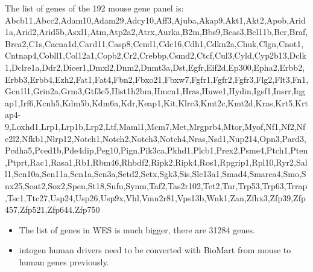 \documentclass[
  letterpaper,
  DIV=11,
  numbers=noendperiod]{scrreprt}
\providecommand{\tightlist}{%
  \setlength{\itemsep}{0pt}\setlength{\parskip}{0pt}}\usepackage{longtable,booktabs,array}
\begin{document}
The list of genes of the 192 mouse gene panel is:
Abcb11,Abcc2,Adam10,Adam29,Adcy10,Aff3,Ajuba,Akap9,Akt1,Akt2,Apob,Arid1a,Arid2,Arid5b,Asxl1,Atm,Atp2a2,Atrx,Aurka,B2m,Bbs9,Bcas3,Bcl11b,Bcr,Braf,Brca2,C1s,Cacna1d,Card11,Casp8,Ccnd1,Cdc16,Cdh1,Cdkn2a,Chuk,Clgn,Cnot1,Cntnap4,Cobll1,Col12a1,Copb2,Cr2,Crebbp,Csmd2,Ctcf,Cul3,Cyld,Cyp2b13,Dclk1,Dclre1a,Ddr2,Dicer1,Dmxl2,Dnm2,Dnmt3a,Dst,Egfr,Eif2d,Ep300,Epha2,Erbb2,Erbb3,Erbb4,Ezh2,Fat1,Fat4,Fbn2,Fbxo21,Fbxw7,Fgfr1,Fgfr2,Fgfr3,Flg2,Flt3,Fn1,Gcn1l1,Grin2a,Grm3,Gtf3c5,Hist1h2bm,Hmcn1,Hras,Huwe1,Hydin,Igsf1,Insrr,Iqgap1,Irf6,Kcnh5,Kdm5b,Kdm6a,Kdr,Keap1,Kit,Klrc3,Kmt2c,Kmt2d,Kras,Krt5,Krtap4-9,Loxhd1,Lrp1,Lrp1b,Lrp2,Ltf,Maml1,Mcm7,Met,Mrgprb4,Mtor,Myof,Nf1,Nf2,Nfe2l2,Nfkb1,Nlrp12,Notch1,Notch2,Notch3,Notch4,Nras,Nsd1,Nup214,Opn3,Pard3,Pcdha5,Pced1b,Pde4dip,Peg10,Pign,Pik3ca,Pkhd1,Plcb1,Prex2,Psme4,Ptch1,Pten,Ptprt,Rac1,Rasa1,Rb1,Rbm46,Rhbdf2,Ripk2,Ripk4,Ros1,Rpgrip1,Rpl10,Ryr2,Sall1,Scn10a,Scn11a,Scn1a,Scn3a,Setd2,Setx,Sgk3,Sis,Slc13a1,Smad4,Smarca4,Smo,Snx25,Soat2,Sox2,Spen,St18,Sufu,Synm,Taf2,Tas2r102,Tet2,Tnr,Trp53,Trp63,Trrap,Tsc1,Ttc27,Usp24,Usp26,Usp9x,Vhl,Vmn2r81,Vps13b,Wnk1,Zan,Zfhx3,Zfp39,Zfp457,Zfp521,Zfp644,Zfp750

\begin{itemize}
\tightlist
\item
  The list of genes in WES is much bigger, there are 31284 genes.
\item
  intogen human drivers need to be converted with BioMart from mouse to
  human genes previously.
\end{itemize}
\end{document}
